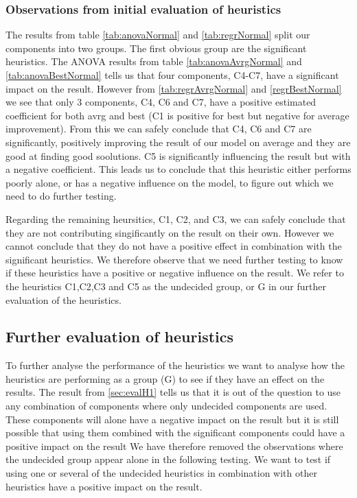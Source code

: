 \documentclass[../main.tex]{subfiles}
\begin{document}
\subsubsection{Observations from initial evaluation of heuristics}
The results from table \ref{tab:anovaNormal} and \cref{tab:regrNormal} split our components into two groups. 
The first obvious group are the significant heuristics.
The ANOVA results from table \ref{tab:anovaAvrgNormal} and \cref{tab:anovaBestNormal} tells us that four components, C4-C7, have a significant impact on the result.
However from \ref{tab:regrAvrgNormal} and \cref{regrBestNormal} we see that only 3 components, C4, C6 and C7, have a positive estimated coefficient for both avrg and best (C1 is positive for best but negative for average improvement).
From this we can safely conclude that C4, C6 and C7 are significantly, positively improving the result of our model on average and they are good at finding good soolutions. 
C5 is significantly influencing the result but with a negative coefficient. 
This leads us to conclude that this heuristic either performs poorly alone, or has a negative influence on the model, to figure out which we need to do further testing.
\par
Regarding the remaining heursitics, C1, C2, and C3, we can safely conclude that they are not contributing singificantly on the result on their own. 
However we cannot conclude that they do not have a positive effect in combination with the significant heuristics. 
We therefore observe that we need further testing to know if these heuristics have a positive or negative influence on the result.
We refer to the heuristics C1,C2,C3 and C5 as the undecided group, or G in our further evaluation of the heuristics.

\subsection{Further evaluation of heuristics}
\label{sec:evalH2}
To further analyse the performance of the heuristics we want to analyse how the heuristics are performing as a group (G) to see if they have an effect on the results.
The result from \cref{sec:evalH1} tells us that it is out of the question to use any combination of components where only undecided components are used.
These components will alone have a negative impact on the result but it is still possible that using them combined with the significant components could have a positive impact on the result
We have therefore removed the observations where the undecided group appear alone in the following testing.
We want to test if using one or several of the undecided heuristics in combination with other heuristics have a positive impact on the result.
\end{document}
